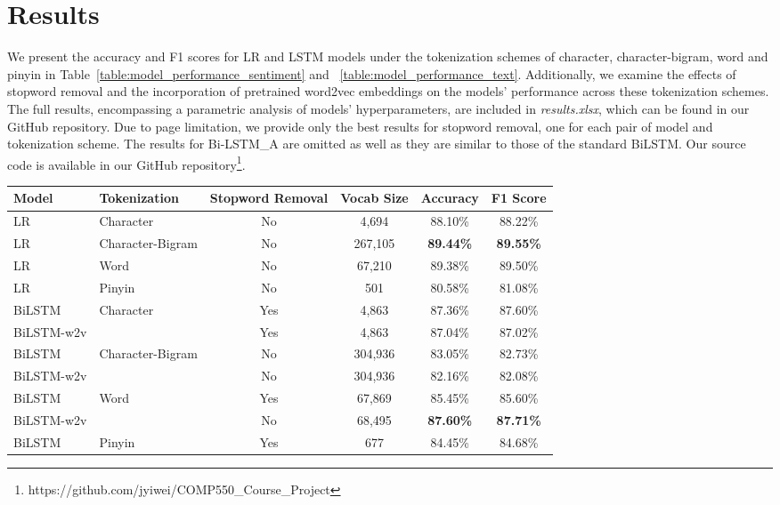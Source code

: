 \section{Results}

We present the accuracy and F1 scores for LR and LSTM models under the tokenization schemes of character, character-bigram, word and pinyin in Table~\ref{table:model_performance_sentiment} and ~\ref{table:model_performance_text}. Additionally, we examine the effects of stopword removal and the incorporation of pretrained word2vec embeddings on the models' performance across these tokenization schemes. The full results, encompassing a parametric analysis of models' hyperparameters, are included in \emph{results.xlsx}, which can be found in our GitHub repository. Due to page limitation, we provide only the best results for stopword removal, one for each pair of model and tokenization scheme. The results for Bi-LSTM\_A are omitted as well as they are similar to those of the standard BiLSTM. Our source code is available in our GitHub repository\footnote{https://github.com/jyiwei/COMP550\_Course\_Project}.


\begin{table*}[ht]
\centering
\begin{tabular}{l l c c c c}
\hline
\textbf{Model} & \textbf{Tokenization} & \textbf{Stopword Removal} & \textbf{Vocab Size} & \textbf{Accuracy} & \textbf{F1 Score} \\ 
\hline
\hline
LR & Character & No & 4,694 & 88.10\% & 88.22\% \\
LR & Character-Bigram & No & 267,105 & \textbf{89.44\%} & \textbf{89.55\%} \\
LR & Word & No & 67,210 & 89.38\% & 89.50\% \\
LR & Pinyin & No & 501 & 80.58\% & 81.08\% \\
\hline
\hline
BiLSTM & \multirow{2}{*}{Character} & Yes & 4,863 & 87.36\% & 87.60\% \\
BiLSTM-w2v &  & Yes & 4,863 & 87.04\% & 87.02\% \\
\hline
BiLSTM & \multirow{2}{*}{Character-Bigram} & No & 304,936 & 83.05\% & 82.73\% \\
BiLSTM-w2v & & No & 304,936 & 82.16\% & 82.08\% \\
\hline
BiLSTM & \multirow{2}{*}{Word} & Yes & 67,869 & 85.45\% & 85.60\% \\
BiLSTM-w2v & & No & 68,495 & \textbf{87.60\%} & \textbf{87.71\%} \\
\hline
BiLSTM & Pinyin & Yes & 677 & 84.45\% & 84.68\% \\
\hline
\end{tabular}
\caption{Performance Comparison of LR and BiLSTM Models Using Various Tokenization Methods and Stopword Settings on \textit{OnlineShopping10cats} Dataset for Text Classification}
\label{table:model_performance_text}
\end{table*}



